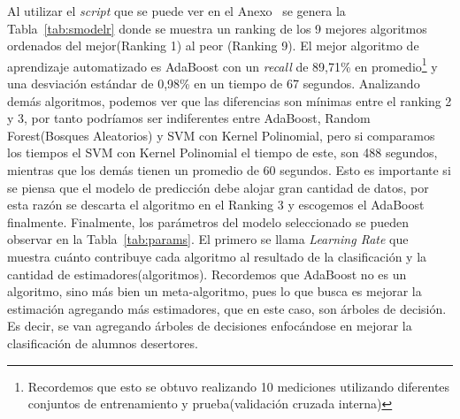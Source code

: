Al utilizar el \textit{script} que se puede ver en el Anexo~ se genera la Tabla~\ref{tab:smodelr} donde se muestra un ranking de los 9 mejores algoritmos ordenados del mejor(Ranking 1) al peor (Ranking 9). El mejor algoritmo de aprendizaje automatizado es AdaBoost con un \textit{recall} de 89,71\% en promedio\footnote{Recordemos que esto se obtuvo realizando 10 mediciones utilizando diferentes conjuntos de entrenamiento y prueba(validación cruzada interna)} y una desviación estándar de 0,98\% en un tiempo de 67 segundos. Analizando demás algoritmos, podemos ver que las diferencias son mínimas entre el ranking 2 y 3, por tanto podríamos ser indiferentes entre AdaBoost, Random Forest(Bosques Aleatorios) y SVM con Kernel Polinomial, pero si comparamos los tiempos el SVM con Kernel Polinomial el tiempo de este, son 488 segundos, mientras que los demás tienen un promedio de 60 segundos. Esto es importante si se piensa que el modelo de predicción debe alojar gran cantidad de datos, por esta razón se descarta el algoritmo en el Ranking 3 y escogemos el AdaBoost finalmente.
Finalmente, los parámetros del modelo seleccionado se pueden observar en la Tabla~\ref{tab:params}. El primero se llama \textit{Learning Rate} que muestra cuánto contribuye cada algoritmo al resultado de la clasificación y la cantidad de estimadores(algoritmos). Recordemos que AdaBoost no es un algoritmo, sino más bien un meta-algoritmo, pues lo que busca es mejorar la estimación agregando más estimadores, que en este caso, son árboles de decisión. Es decir, se van agregando árboles de decisiones enfocándose en mejorar la clasificación de alumnos desertores.
